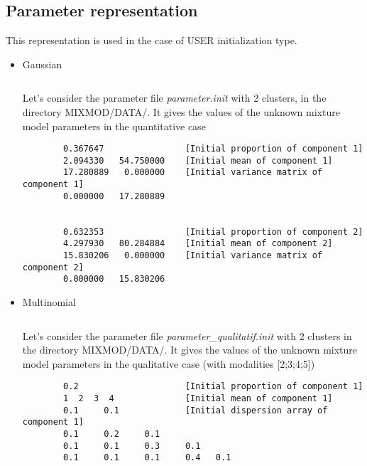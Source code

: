 
\subsection{Parameter representation} \label{parameterRepresentationSection}
This representation is used in the case of USER initialization type.\\
\begin{itemize}
 \item Gaussian

$ $

Let's consider the parameter file {\it parameter.init} with 2
clusters, in the directory MIXMOD/DATA/. It gives the values of the unknown mixture model parameters in the quantitative case
{\scriptsize
\begin{verbatim}
        0.367647                [Initial proportion of component 1]
        2.094330   54.750000    [Initial mean of component 1]
        17.280889   0.000000    [Initial variance matrix of component 1]
        0.000000   17.280889


        0.632353                [Initial proportion of component 2]
        4.297930   80.284884    [Initial mean of component 2]
        15.830206   0.000000    [Initial variance matrix of component 2]
        0.000000   15.830206
\end{verbatim}}

\item Multinomial

$ $

Let's consider the parameter file {\it parameter\_qualitatif.init} with 2 clusters in the directory MIXMOD/DATA/.
It gives the values of the unknown mixture model parameters in the qualitative case (with modalities [2;3;4;5])
{\scriptsize
 \begin{verbatim}
        0.2                     [Initial proportion of component 1]
        1  2  3  4              [Initial mean of component 1]
        0.1     0.1             [Initial dispersion array of component 1]
        0.1     0.2     0.1
        0.1     0.1     0.3     0.1
        0.1     0.1     0.1     0.4   0.1



\end{verbatim}}
\end{itemize}
